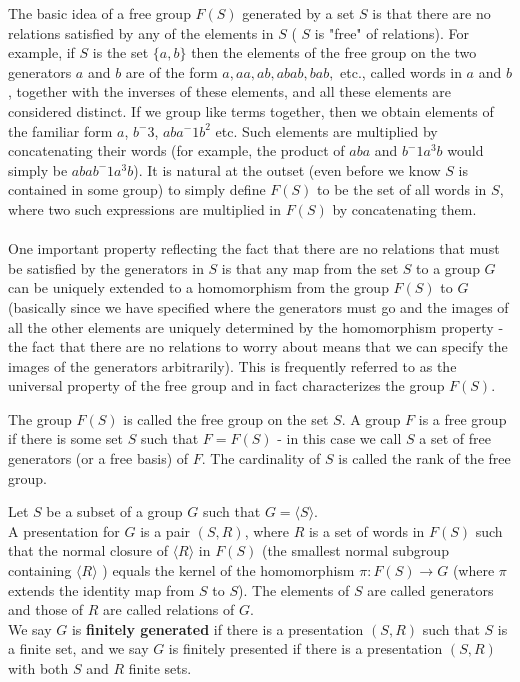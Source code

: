 The basic idea of a free group $F(S)$ generated by a set $S$ is that there are no relations satisfied by any of the elements in $S$ ( $S$ is "free" of relations). For example, if $S$ is the
set $\{a, b\}$ then the elements of the free group on the two generators $a$ and $b$ are of the
form $a, aa, ab, abab, bab,$ etc., called words in $a$ and $b$, together with the inverses of
these elements, and all these elements are considered distinct. If we group like terms
together, then we obtain elements of the familiar form $a$, $b^-3$, $aba^-1b^2$ etc. Such
elements are multiplied by concatenating their words (for example, the product of $aba$
and $b^-1a^3b$ would simply be $abab^-1a^3b$). It is natural at the outset (even before we
know $S$ is contained in some group) to simply define $F(S)$ to be the set of all words in $S$,
where two such expressions are multiplied in $F(S)$ by concatenating them. \\
\\
One important property reflecting the fact that there are no relations that must be
satisfied by the generators in $S$ is that any map from the set $S$ to a group $G$ can be
uniquely extended to a homomorphism from the group $F(S)$ to $G$ (basically since we
have specified where the generators must go and the images of all the other elements
are uniquely determined by the homomorphism property - the fact that there are
no relations to worry about means that we can specify the images of the generators
arbitrarily). This is frequently referred to as the universal property of the free group
and in fact characterizes the group $F(S)$.
\\

\begin{definition}
The group $F(S)$ is called the free group on the set $S$. A group $F$ is a free
group if there is some set $S$ such that $F = F(S)$ - in this case we call $S$ a set of free
generators (or a free basis) of $F$. The cardinality of $S$ is called the rank of the free
group.
\end{definition}

\begin{definition}
Let $S$ be a subset of a group $G$ such that $G = \langle S \rangle$.\\
A presentation for $G$ is a pair $(S, R)$, where $R$ is a set of words in $F(S)$ such that
the normal closure of $\langle R \rangle$ in $F(S)$ (the smallest normal subgroup containing
$\langle R \rangle$ ) equals the kernel of the homomorphism $\pi : F (S) \rightarrow G$ (where $\pi$ extends the identity map from $S$ to $S$). The elements of $S$ are called generators and those
of $R$ are called relations of $G$.\\
We say $G$ is \textbf{finitely generated} if there is a presentation $(S,R)$ such that $S$ is a finite set, and we say $G$ is finitely presented if there is a presentation $(S, R)$ with
both $S$ and $R$ finite sets.
\end{definition}

